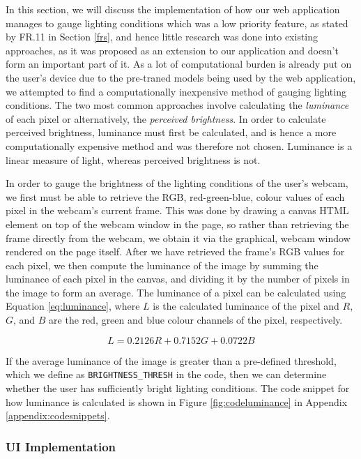 \documentclass[12pt, a4paper]{article}
\newcommand{\np}
    {
    \vskip 0.4cm
    }
\begin{document}
In this section, we will discuss the implementation of how our web application manages to gauge lighting conditions which was a low priority feature, as stated by FR.11 in Section \ref{frs}, and hence little research was done into existing approaches, as it was proposed as an extension to our application and doesn't form an important part of it. As a lot of computational burden is already put on the user's device due to the pre-traned models being used by the web application, we attempted to find a computationally inexpensive method of gauging lighting conditions. The two most common approaches involve calculating the \textit{luminance} of each pixel or alternatively, the \textit{perceived brightness}. In order to calculate perceived brightness, luminance must first be calculated, and is hence a more computationally expensive method and was therefore not chosen. Luminance is a linear measure of light, whereas perceived brightness is not. 
\np
In order to gauge the brightness of the lighting conditions of the user's webcam, we first must be able to retrieve the RGB, red-green-blue, colour values of each pixel in the webcam's current frame. This was done by drawing a canvas HTML element on top of the webcam window in the page, so rather than retrieving the frame directly from the webcam, we obtain it via the graphical, webcam window rendered on the page itself. After we have retrieved the frame's RGB values for each pixel, we then compute the luminance of the image by summing the luminance of each pixel in the canvas, and dividing it by the number of pixels in the image to form an average. The luminance of a pixel can be calculated using Equation \ref{eq:luminance}, where $L$ is the calculated luminance of the pixel and $R$, $G$, and $B$ are the red, green and blue colour channels of the pixel, respectively.

\begin{equation}
    L = 0.2126R + 0.7152G + 0.0722B\label{eq:luminance}
\end{equation}

If the average luminance of the image is greater than a pre-defined threshold, which we define as \verb+BRIGHTNESS_THRESH+ in the code, then we can determine whether the user has sufficiently bright lighting conditions. The code snippet for how luminance is calculated is shown in Figure \ref{fig:codeluminance} in Appendix \ref{appendix:codesnippets}.

\subsubsection{UI Implementation}
\label{uii}
\end{document}
